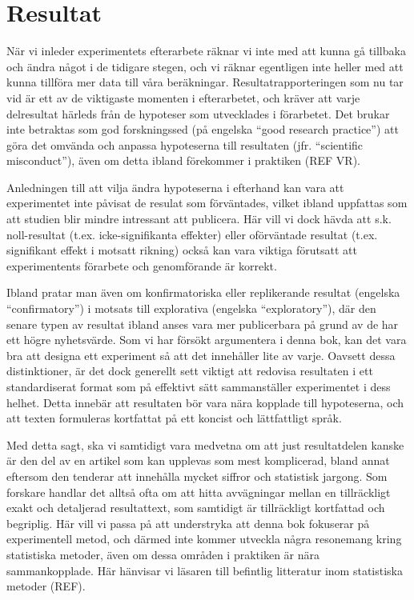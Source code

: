\documentclass[
]{book}
\begin{document}
\hypertarget{sec08.1}{%
\section{Resultat}\label{sec08.1}}

När vi inleder experimentets efterarbete räknar vi inte med att kunna gå tillbaka och ändra något i de tidigare stegen, och vi räknar egentligen inte heller med att kunna tillföra mer data till våra beräkningar. Resultatrapporteringen som nu tar vid är ett av de viktigaste momenten i efterarbetet, och kräver att varje delresultat härleds från de hypoteser som utvecklades i förarbetet. Det brukar inte betraktas som god forskningssed (på engelska ``good research practice'') att göra det omvända och anpassa hypoteserna till resultaten (jfr. ``scientific misconduct''), även om detta ibland förekommer i praktiken (REF VR).

Anledningen till att vilja ändra hypoteserna i efterhand kan vara att experimentet inte påvisat de resulat som förväntades, vilket ibland uppfattas som att studien blir mindre intressant att publicera. Här vill vi dock hävda att s.k. noll-resultat (t.ex. icke-signifikanta effekter) eller oförväntade resultat (t.ex. signifikant effekt i motsatt rikning) också kan vara viktiga förutsatt att experimentents förarbete och genomförande är korrekt.

Ibland pratar man även om konfirmatoriska eller replikerande resultat (engelska ``confirmatory'') i motsats till explorativa (engelska ``exploratory''), där den senare typen av resultat ibland anses vara mer publicerbara på grund av de har ett högre nyhetsvärde. Som vi har försökt argumentera i denna bok, kan det vara bra att designa ett experiment så att det innehåller lite av varje. Oavsett dessa distinktioner, är det dock generellt sett viktigt att redovisa resultaten i ett standardiserat format som på effektivt sätt sammanställer experimentet i dess helhet. Detta innebär att resultaten bör vara nära kopplade till hypoteserna, och att texten formuleras kortfattat på ett koncist och lättfattligt språk.

Med detta sagt, ska vi samtidigt vara medvetna om att just resultatdelen kanske är den del av en artikel som kan upplevas som mest komplicerad, bland annat eftersom den tenderar att innehålla mycket siffror och statistisk jargong. Som forskare handlar det alltså ofta om att hitta avvägningar mellan en tillräckligt exakt och detaljerad resultattext, som samtidigt är tillräckligt kortfattad och begriplig. Här vill vi passa på att understryka att denna bok fokuserar på experimentell metod, och därmed inte kommer utveckla några resonemang kring statistiska metoder, även om dessa områden i praktiken är nära sammankopplade. Här hänvisar vi läsaren till befintlig litteratur inom statistiska metoder (REF).
\end{document}
